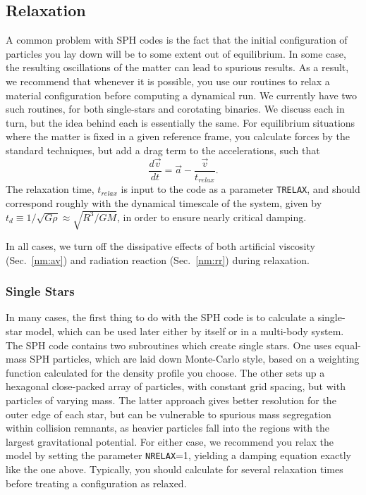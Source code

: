 \subsection{Relaxation}
\label{nm:re}
A common problem with SPH codes is the fact that the initial
configuration of particles you lay down will be to some extent out of
equilibrium.  In some case, the resulting oscillations of the matter
can lead to spurious results.  As a result, we recommend that whenever
it is possible, you use our routines to relax a material
configuration before computing a dynamical run.  We currently have two
such routines, for both single-stars and corotating binaries.  We
discuss each in turn, but the idea behind each is essentially the
same.  For equilibrium situations where the matter is fixed in a given
reference frame, you calculate forces by the standard techniques, but
add a drag term to the accelerations, such that
\begin{equation}
\frac{d\vec{v}}{dt}=\vec{a}-\frac{\vec{v}}{t_{relax}}.\label{eq:relax1}
\end{equation}
The relaxation time, $t_{relax}$ is input to the code as a parameter
{\tt TRELAX}, and should correspond roughly with the dynamical
timescale of the system, given by $t_d\equiv
1/\sqrt{G\rho}\approx\sqrt{R^3/GM}$,  in order to ensure nearly
critical damping. 

In all cases, we turn off the dissipative effects of both artificial
viscosity (Sec.~\ref{nm:av}) and radiation reaction (Sec.~\ref{nm:rr}) 
during relaxation.

\subsubsection{Single Stars}
\label{nm:re:1s}
In many cases, the first thing to do with the SPH code is to calculate
a single-star model, which can be used later either by itself or in a
multi-body system.  The SPH code 
contains two subroutines which create single stars.  One uses
equal-mass SPH particles, which are laid down Monte-Carlo style, based
on a weighting function calculated for the density profile you choose.
The other sets up a hexagonal close-packed array of particles, with
constant grid spacing, but with particles of varying mass.  The latter
approach gives better resolution for the outer edge of each star, but
can be vulnerable to spurious mass segregation within collision remnants, as
heavier particles fall into the regions with the largest gravitational
potential.  For either case, we recommend you relax the model by
setting the parameter {\tt NRELAX}=1, yielding a damping equation
exactly like the one above.  Typically, you should calculate for
several relaxation times before treating a configuration as relaxed.

